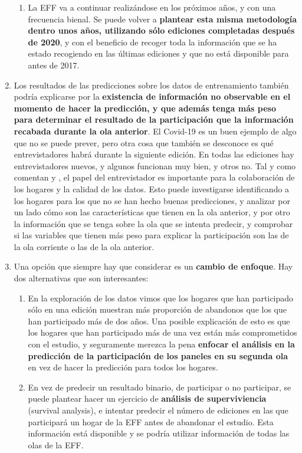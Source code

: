 \begin{enumerate}
\begin{enumerate}
        \item La EFF va a continuar realizándose en los próximos años, y con una frecuencia bienal. Se puede volver a \textbf{plantear esta misma metodología dentro unos años, utilizando sólo ediciones completadas después de 2020}, y con el beneficio de recoger toda la información que se ha estado recogiendo en las últimas ediciones y que no está disponible para antes de 2017.
    \end{enumerate}
    \item Los resultados de las predicciones sobre los datos de entrenamiento también podría explicarse por la \textbf{existencia de información no observable en el momento de hacer la predicción, y que además tenga más peso para determinar el resultado de la participación que la información recabada durante la ola anterior}. El Covid-19 es un buen ejemplo de algo que no se puede prever, pero otra cosa que también se desconoce es qué entrevistadores habrá durante la siguiente edición. En todas las ediciones hay entrevistadores nuevos, y algunos funcionan muy bien, y otros no. Tal y como comentan \cite{lynn2018tackling} y \cite{groves2006nonresponse}, el papel del entrevistador es importante para la colaboración de los hogares y la calidad de los datos. Esto puede investigarse identificando a los hogares para los que no se han hecho buenas predicciones, y analizar por un lado cómo son las características que tienen en la ola anterior, y por otro la información que se tenga sobre la ola que se intenta predecir, y comprobar si las variables que tienen más peso para explicar la participación son las de la ola corriente o las de la ola anterior.
    \item Una opción que siempre hay que considerar es un \textbf{cambio de enfoque}. Hay dos alternativas que son interesantes:
    \begin{enumerate}
        \item En la exploración de los datos vimos que los hogares que han participado sólo en una edición muestran más proporción de abandonos que los que han participado más de dos años. Una posible explicación de esto es que los hogares que han participado más de una vez están más comprometidos con el estudio, y seguramente merezca la pena \textbf{enfocar el análisis en la predicción de la participación de los paneles en su segunda ola} en vez de hacer la predicción para todos los hogares.
        \item En vez de predecir un resultado binario, de participar o no participar, se puede plantear hacer un ejercicio de \textbf{análisis de superviviencia} (survival analysis), e intentar predecir el número de ediciones en las que participará un hogar de la EFF antes de abandonar el estudio. Esta información está disponible y se podría utilizar información de todas las olas de la EFF.
    \end{enumerate}
\end{enumerate}